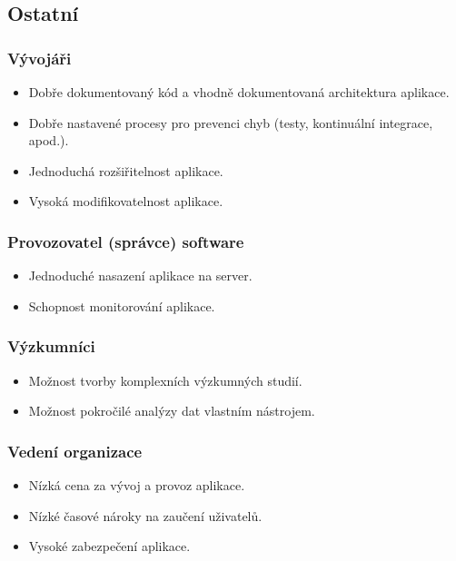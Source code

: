 \subsection*{Ostatní}\label{subsec:ostatni}

\subsubsection*{Vývojáři}\label{subsubsec:vyvojari}

\begin{itemize}
  \item
  Dobře dokumentovaný kód a vhodně dokumentovaná architektura aplikace.
  \item
  Dobře nastavené procesy pro prevenci chyb (testy, kontinuální integrace, apod.).
  \item
  Jednoduchá rozšiřitelnost aplikace.
  \item
  Vysoká modifikovatelnost aplikace.
\end{itemize}

\subsubsection*{Provozovatel (správce) software}\label{subsubsec:provozovatel-spravce-software}

\begin{itemize}
  \item
  Jednoduché nasazení aplikace na server.
  \item
  Schopnost monitorování aplikace.
\end{itemize}

\subsubsection*{Výzkumníci}\label{subsubsec:vyzkumnici}

\begin{itemize}
  \item
  Možnost tvorby komplexních výzkumných studií.
  \item
  Možnost pokročilé analýzy dat vlastním nástrojem.
\end{itemize}

\subsubsection*{Vedení organizace}\label{subsubsec:vedeni-organizace}

\begin{itemize}
  \item
  Nízká cena za vývoj a provoz aplikace.
  \item
  Nízké časové nároky na zaučení uživatelů.
  \item
  Vysoké zabezpečení aplikace.
\end{itemize}
